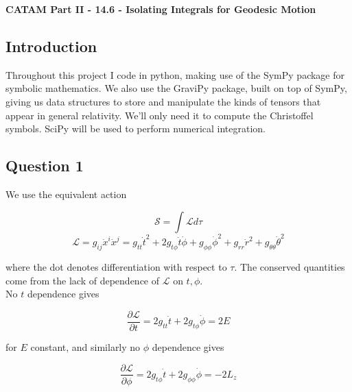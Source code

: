 \documentclass[10pt,a4paper]{report}
\begin{document}
\textbf{CATAM Part II - 14.6 - Isolating Integrals for Geodesic Motion}
\thispagestyle{empty}

\newpage

\subsection*{Introduction}

Throughout this project I code in python, making use of the SymPy package for symbolic mathematics. We also use the GraviPy package, built on top of SymPy, giving us data structures to store and manipulate the kinds of tensors that appear in general relativity. We'll only need it to compute the Christoffel symbols. SciPy will be used to perform numerical integration. %

\subsection*{Question 1}

We use the equivalent action 

\begin{equation*}
\mathcal{S}=\int \mathcal{L} d\tau
\end{equation*}
\begin{equation*}
\mathcal{L}=g_{ij}\dot{x}^i\dot{x}^j = g_{tt}\dot{t}^2 + 2g_{t\phi}\dot{t}\dot{\phi}+g_{\phi\phi}\dot{\phi}^2+g_{rr}\dot{r}^2+g_{\theta\theta}\dot{\theta}^2
\end{equation*} 

where the dot denotes differentiation with respect to $\tau$. The conserved quantities come from the lack of dependence of $\mathcal{L}$ on $t, \phi$.\\

No $t$ dependence gives

\begin{equation}
\frac{\partial \mathcal{L}}{\partial t} = 2g_{tt}\dot{t} + 2g_{t\phi}\dot{\phi} = 2E
\label{Edef}
\end{equation}

for $E$ constant, and similarly no $\phi$ dependence gives 

\begin{equation}
\frac{\partial \mathcal{L}}{\partial \phi} = 2g_{t\phi}\dot{t}+2g_{\phi\phi}\dot{\phi} = -2L_z
\label{Ldef}
\end{equation}
\end{document}
